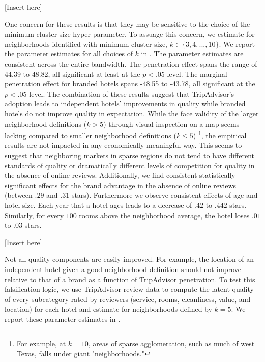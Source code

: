 \documentclass[mksc,blindrev]{informs3} %
\begin{document}
[Insert  here]



One concern for these results is that they may be sensitive to the choice of the minimum cluster size hyper-parameter. To assuage this concern, we estimate  for neighborhoods identified with minimum cluster size, $k\in\{3,4,...,10\}$. We report the parameter estimates for all choices of $k$ in . The parameter estimates are consistent across the entire bandwidth. The penetration effect spans the range of 44.39 to 48.82, all significant at least at the $p<.05$ level. The marginal penetration effect for branded hotels spans -48.55 to -43.78, all significant at the $p<.05$ level. The combination of these results suggest that TripAdvisor's adoption leads to independent hotels' improvements in quality while branded hotels do not improve quality in expectation. While the face validity of the larger neighborhood definitions ($k>5$) through visual inspection on a map seems lacking compared to smaller neighborhood definitions ($k\le 5$) \footnote{For example, at $k=10$, areas of sparse agglomeration, such as much of west Texas, falls under giant "neighborhoods."}, the empirical results are not impacted in any economically meaningful way. This seems to suggest that neighboring markets in sparse regions do not tend to have different standards of quality or dramatically different levels of competition for quality in the absence of online reviews. Additionally, we find consistent statistically significant effects for the brand advantage in the absence of online reviews (between $.29$ and $.31$ stars). Furthermore we observe consistent effects of age and hotel size. Each year that a hotel ages leads to a decrease of $.42$ to $.442$ stars. Similarly, for every $100$ rooms above the neighborhood average, the hotel loses $.01$ to $.03$ stars.

[Insert  here]

Not all quality components are easily improved. For example, the location of an independent hotel given a good neighborhood definition should not improve relative to that of a brand as a function of TripAdvisor penetration. To test this falsification logic, we use TripAdvisor review data to compute the latent quality of every subcategory rated by reviewers (service, rooms, cleanliness, value, and location) for each hotel and estimate  for neighborhoods defined by $k=5$. We report these parameter estimates in . 
\end{document}

